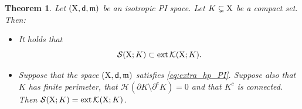 \documentclass[reqno]{amsart}
\numberwithin{equation}{section}
\newcommand{\X}{{\rm X}}
\newcommand{\sfd}{{\sf d}}
\newcommand{\mm}{\mathfrak m}
\newcommand{\1}{\mathbbm 1}
\renewcommand{\H}{{\mathcal H}}
\newtheorem{theorem}{Theorem}[section]
\begin{document}
%
%
\begin{theorem}\label{thm:extreme_points_BV}
Let \((\X,\sfd,\mm)\) be an isotropic PI space.
Let \(K\subsetneq\X\) be a compact set. Then:
\begin{itemize}
\item[\(\rm i)\)] It holds that
\begin{equation}\label{eq:S_in_extK}
\mathcal S(\X;K)\subset{\rm ext}\,\mathcal K(\X;K).
\end{equation}
\item[\(\rm ii)\)] Suppose that the space \((\X,\sfd,\mm)\) satisfies
\eqref{eq:extra_hp_PI}. Suppose also that \(K\) has finite perimeter,
that \(\H(\partial K\setminus\partial^e K)=0\) and that \(K^c\) is connected.
Then \(\mathcal S(\X;K)={\rm ext}\,\mathcal K(\X;K)\).
\end{itemize}
\end{theorem}
\end{document}
